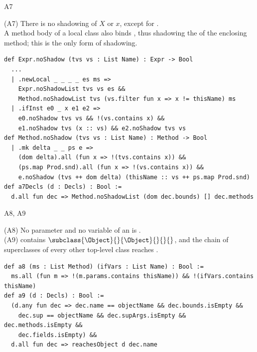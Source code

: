 \begin{cmp}{A7}
\begin{paperside}
(A7) There is no shadowing of $X$ or $x$, except for \Q@this@.\\[1ex]
A method body of a local class also binds \Q@this@, thus shadowing the \Q@this@ of the enclosing method; this is the only form of shadowing.
\end{paperside}
\begin{leanside}
\begin{lstlisting}[style=leanside]
def Expr.noShadow (tvs vs : List Name) : Expr -> Bool
  ...
  | .newLocal _ _ _ _ es ms =>
    Expr.noShadowList tvs vs es &&
    Method.noShadowList tvs (vs.filter fun x => x != thisName) ms
  | .ifInst e0 _ x e1 e2 =>
    e0.noShadow tvs vs && !(vs.contains x) &&
    e1.noShadow tvs (x :: vs) && e2.noShadow tvs vs
def Method.noShadow (tvs vs : List Name) : Method -> Bool
  | .mk delta _ _ ps e =>
    (dom delta).all (fun x => !(tvs.contains x)) &&
    (ps.map Prod.snd).all (fun x => !(vs.contains x)) &&
    e.noShadow (tvs ++ dom delta) (thisName :: vs ++ ps.map Prod.snd)
def a7Decls (d : Decls) : Bool :=
  d.all fun dec => Method.noShadowList (dom dec.bounds) [] dec.methods
\end{lstlisting}
\end{leanside}
\end{cmp}

\begin{cmp}{A8, A9}
\begin{paperside}
(A8) No parameter and no variable of an \Q@if@ is \Q@this@.\\
(A9) \decls contains $\subclass{\Object}{}{\Object}{}{}{}$, and the chain of superclasses of every other top-level class reaches \Q@Object@.
\end{paperside}
\begin{leanside}
\begin{lstlisting}[style=leanside]
def a8 (ms : List Method) (ifVars : List Name) : Bool :=
  ms.all (fun m => !(m.params.contains thisName)) && !(ifVars.contains thisName)
def a9 (d : Decls) : Bool :=
  (d.any fun dec => dec.name == objectName && dec.bounds.isEmpty &&
    dec.sup == objectName && dec.supArgs.isEmpty && dec.methods.isEmpty &&
    dec.fields.isEmpty) &&
  d.all fun dec => reachesObject d dec.name
\end{lstlisting}
\end{leanside}
\end{cmp}


